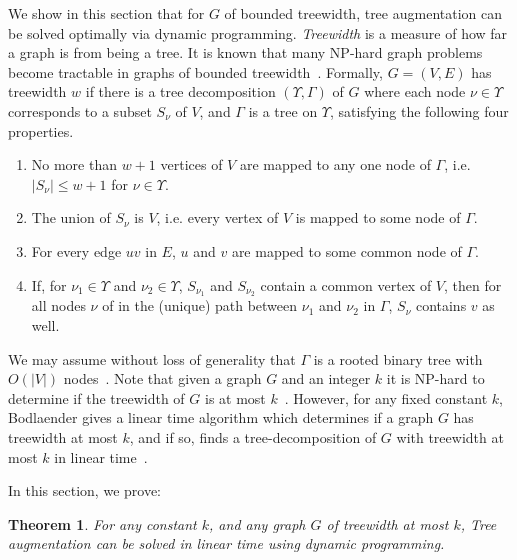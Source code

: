 \documentclass{article}
\newtheorem{theorem}{Theorem}
\newcommand{\tw}{w}
\begin{document}
We show in this section that for $G$ of bounded treewidth, {\sc tree
augmentation} can be solved optimally via dynamic programming.  {\em
Treewidth} is a measure of how far a graph is from being a tree.  It
is known that many NP-hard graph problems become tractable
in graphs of bounded treewidth~\cite{CM92}.
Formally, $G = (V,E)$ has treewidth
$\tw$ if there is a tree decomposition $(\Upsilon, \Gamma)$ of $G$ where
each node $\nu \in \Upsilon$ corresponds to
a subset $S_{\nu}$ of $V$,
and $\Gamma$ is a tree on $\Upsilon$, satisfying
the following four properties.
\begin{enumerate}
\item No more than $\tw+1$ vertices of $V$ are mapped to any one node
  of $\Gamma$, i.e. $|S_{\nu}|\le \tw+1$ for $\nu\in \Upsilon$.
\item 
 The union of $S_{\nu}$ is  $V$, i.e. every
vertex of $V$ is mapped to some node of $\Gamma$.
\item 
 For every edge $uv$ in $E$, $u$ and $v$ are mapped to some
  common node of $\Gamma$.
\item 
If, for $\nu_1\in \Upsilon$ and $\nu_2\in \Upsilon$, $S_{\nu_1}$ and
$S_{\nu_2}$ contain a common vertex of $V$, then for all nodes $\nu$
of in the (unique) path between $\nu_1$ and $\nu_2$ in $\Gamma$,
$S_{\nu}$ contains $v$ as well.
\end{enumerate}
We may assume without loss of generality that $\Gamma$ is a rooted
binary tree with $O(|V|)$ nodes~\cite{Bodlaender93}.  
Note that given a graph $G$ and an integer $k$ it is NP-hard to determine if the treewidth of $G$ is at most $k$~\cite{ACP87}.
However, for any fixed constant $k$, Bodlaender gives a linear time algorithm which determines if a graph $G$ has treewidth at most $k$, and if so, finds a tree-decomposition of $G$ with treewidth at most $k$ in linear time~\cite{Bod96}.


In this section, we prove:
\begin{theorem}\label{thm:tw}
For any constant $k$, and any graph $G$ of treewidth at most $k$,
{\sc Tree augmentation} 
can be solved in linear time using dynamic programming.
\end{theorem}
\end{document}
